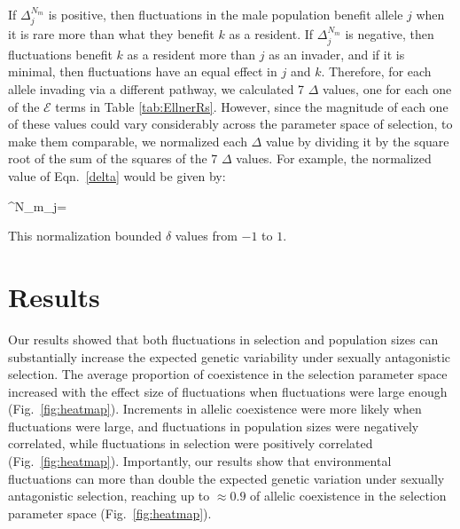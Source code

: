 \documentclass[12pt]{article}
\let\oldequation\equation
\let\oldendequation\endequation
\renewenvironment{equation}
  {\linenomathNonumbers\oldequation}
  {\oldendequation\endlinenomath}
\begin{document}
If $\Delta^{N_{m}}_{j}$ is positive, then fluctuations in the male population benefit allele $j$ when it is rare more than what they benefit $k$ as a resident. If $\Delta^{N_{m}}_{j}$ is negative, then fluctuations benefit $k$ as a resident more than $j$ as an invader, and if it is minimal, then fluctuations have an equal effect in $j$ and $k$. Therefore, for each allele invading via a different pathway, we calculated 7 $\Delta$ values, one for each one of the $\mathcal{E}$ terms in Table \ref{tab:EllnerRs}. However, since the magnitude of each one of these values could vary considerably across the parameter space of selection, to make them comparable, we normalized each $\Delta$ value by dividing it by the square root of the sum of the squares of the 7 $\Delta$ values. For example, the normalized value of Eqn.~\ref{delta} would be given by:



\begin{equation}
  \delta^{N_{m}}_{j}= 
\end{equation}

This normalization bounded $\delta$ values from $-1$ to $1$.

\section{Results}
Our results showed that both fluctuations in selection and population sizes can substantially increase the expected genetic variability under sexually antagonistic selection. The average proportion of coexistence in the selection parameter space increased with the effect size of fluctuations when fluctuations were large enough (Fig.~\ref{fig:heatmap}). Increments in allelic coexistence were more likely when fluctuations were large, and fluctuations in population sizes were negatively correlated, while fluctuations in selection were positively correlated (Fig.~\ref{fig:heatmap}). Importantly, our results show that environmental fluctuations can more than double the expected genetic variation under sexually antagonistic selection, reaching up to  $\approx 0.9$  of allelic coexistence in the selection parameter space (Fig.~\ref{fig:heatmap}).

\end{document}
